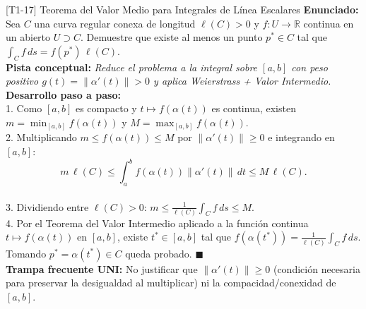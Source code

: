 \documentclass[11pt,a4paper]{article}
\begin{document}
\begin{ejerciciobox}{[T1-17] Teorema del Valor Medio para Integrales de Línea Escalares}
\textbf{Enunciado:} Sea $C$ una curva regular conexa de longitud $\ell(C) > 0$ y $f: U \to \mathbb{R}$ continua en un abierto $U \supset C$. Demuestre que existe al menos un punto $p^* \in C$ tal que $\int_C f\,ds = f(p^*)\,\ell(C)$.\\[0.2cm]
\textbf{Pista conceptual:} \emph{Reduce el problema a la integral sobre $[a,b]$ con peso positivo $g(t) = \|\alpha'(t)\| > 0$ y aplica Weierstrass + Valor Intermedio.}\\[0.2cm]
\textbf{Desarrollo paso a paso:}\\
1. Como $[a,b]$ es compacto y $t \mapsto f(\alpha(t))$ es continua, existen $m = \min_{[a,b]} f(\alpha(t))$ y $M = \max_{[a,b]} f(\alpha(t))$.\\
2. Multiplicando $m \le f(\alpha(t)) \le M$ por $\|\alpha'(t)\| \ge 0$ e integrando en $[a,b]$:\\
$$m\,\ell(C) \le \int_a^b f(\alpha(t))\|\alpha'(t)\|\,dt \le M\,\ell(C).$$\\
3. Dividiendo entre $\ell(C) > 0$: $m \le \frac{1}{\ell(C)}\int_C f\,ds \le M$.\\
4. Por el Teorema del Valor Intermedio aplicado a la función continua $t \mapsto f(\alpha(t))$ en $[a,b]$, existe $t^* \in [a,b]$ tal que $f(\alpha(t^*)) = \frac{1}{\ell(C)}\int_C f\,ds$. Tomando $p^* = \alpha(t^*) \in C$ queda probado. $\blacksquare$\\[0.2cm]
\textbf{Trampa frecuente UNI:} No justificar que $\|\alpha'(t)\| \ge 0$ (condición necesaria para preservar la desigualdad al multiplicar) ni la compacidad/conexidad de $[a,b]$.
\end{ejerciciobox}
\end{document}
